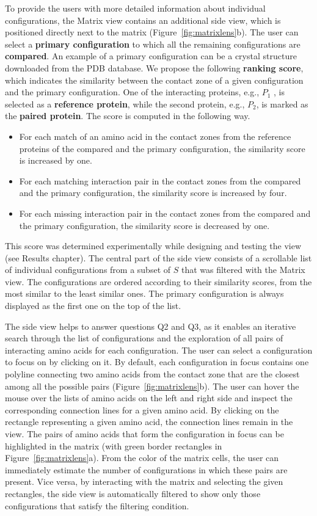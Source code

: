 \documentclass{bmcart}
\def\MatView {Matrix view\xspace}
\begin{document}
To provide the users with more detailed information about individual configurations, the \MatView contains an additional side view, which is positioned directly next to the matrix (Figure~\ref{fig:matrixlens}b).
The user can select a \textbf{primary configuration} to which all the remaining configurations are \textbf{compared}.
An example of a primary configuration can be a crystal structure downloaded from the PDB database.
We propose the following \textbf{ranking score}, which indicates the similarity between the contact zone of a given configuration and the primary configuration.
One of the interacting proteins, e.g., $P_1$ , is selected as a \textbf{reference protein}, while the second protein, e.g., $P_2$, is marked as the \textbf{paired protein}.
The score is computed in the following way.
\begin{itemize}
\item For each match of an amino acid in the contact zones from the reference proteins of the compared and the primary configuration, the similarity score is increased by one.
\item For each matching interaction pair in the contact zones from the compared and the primary configuration, the similarity score is increased by four.
\item For each missing interaction pair in the contact zones from the compared and the primary configuration, the similarity score is decreased by one.
\end{itemize}
This score was determined experimentally while designing and testing the view (see Results chapter). 
The central part of the side view consists of a scrollable list of individual configurations from a subset of $S$ that was filtered with the \MatView.
The configurations are ordered according to their similarity scores, from the most similar to the least similar ones.
The primary configuration is always displayed as the first one on the top of the list.

The side view helps to answer questions Q2 and Q3, as it enables an iterative search through the list of configurations and the exploration of all pairs of interacting amino acids for each configuration.
The user can select a configuration to focus on by clicking on it. 
By default, each configuration in focus contains one polyline connecting two amino acids from the contact zone that are the closest among all the possible pairs (Figure~\ref{fig:matrixlens}b).
The user can hover the mouse over the lists of amino acids on the left and right side and inspect the corresponding connection lines for a given amino acid.
By clicking on the rectangle representing a given amino acid, the connection lines remain in the view. 
The pairs of amino acids that form the configuration in focus can be highlighted in the matrix (with green border rectangles in Figure~\ref{fig:matrixlens}a).
From the color of the matrix cells, the user can immediately estimate the number of configurations in which these pairs are present.
Vice versa, by interacting with the matrix and selecting the given rectangles, the side view is automatically filtered to show only those configurations that satisfy the filtering condition.
\end{document}
